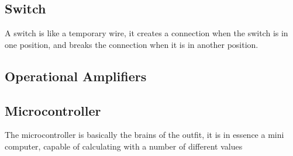 \subsection{Switch}
A switch is like a temporary wire, it creates a connection when the switch is in one position, and breaks the connection when it is in another position.


\subsection{Operational Amplifiers}


% 

\subsection{Microcontroller}

The microcontroller is basically the brains of the outfit, it is in essence a mini computer, capable of calculating with a number of different values

%
